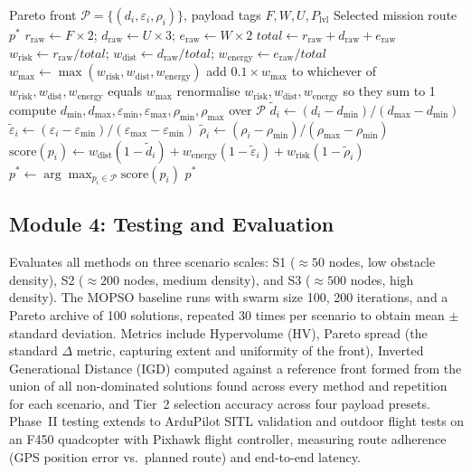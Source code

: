\documentclass{ssnreview}
\begin{document}
\begin{algorithm}[H]
\caption{Payload-Driven Pareto Route Selection (Tier~2)}\label{alg:tier2}
\begin{algorithmic}[1]
\Require Pareto front $\mathcal{P} = \{(d_i,\varepsilon_i,\rho_i)\}$, payload tags $F, W, U, P_\mathrm{lvl}$
\Ensure Selected mission route $p^*$
\State $r_\mathrm{raw} \gets F \times 2$; \quad $d_\mathrm{raw} \gets U \times 3$; \quad $e_\mathrm{raw} \gets W \times 2$
\State $\mathit{total} \gets r_\mathrm{raw} + d_\mathrm{raw} + e_\mathrm{raw}$
\State $w_\mathrm{risk} \gets r_\mathrm{raw}/\mathit{total}$; \quad $w_\mathrm{dist} \gets d_\mathrm{raw}/\mathit{total}$; \quad $w_\mathrm{energy} \gets e_\mathrm{raw}/\mathit{total}$
 
    \State $w_\mathrm{max} \gets \max(w_\mathrm{risk}, w_\mathrm{dist}, w_\mathrm{energy})$
    \State add $0.1 \times w_\mathrm{max}$ to whichever of $w_\mathrm{risk}, w_\mathrm{dist}, w_\mathrm{energy}$ equals $w_\mathrm{max}$
    \State renormalise $w_\mathrm{risk}, w_\mathrm{dist}, w_\mathrm{energy}$ so they sum to 1
\EndIf
\State compute $d_{\min}, d_{\max}, \varepsilon_{\min}, \varepsilon_{\max}, \rho_{\min}, \rho_{\max}$ over $\mathcal{P}$
    \State $\tilde{d}_i \gets (d_i - d_{\min})/(d_{\max} - d_{\min})$ 
    \State $\tilde{\varepsilon}_i \gets (\varepsilon_i - \varepsilon_{\min})/(\varepsilon_{\max} - \varepsilon_{\min})$
    \State $\tilde{\rho}_i \gets (\rho_i - \rho_{\min})/(\rho_{\max} - \rho_{\min})$
    \State $\mathrm{score}(p_i) \gets w_\mathrm{dist}(1-\tilde{d}_i) + w_\mathrm{energy}(1-\tilde{\varepsilon}_i) + w_\mathrm{risk}(1-\tilde{\rho}_i)$
\EndFor
\State $p^* \gets \arg\max_{p_i \in \mathcal{P}} \mathrm{score}(p_i)$
\State \Return $p^*$
\end{algorithmic}
\end{algorithm}

\subsection{Module 4: Testing and Evaluation}
Evaluates all methods on three scenario scales: S1 (${\approx}50$ nodes, low obstacle
density), S2 (${\approx}200$ nodes, medium density), and S3 (${\approx}500$ nodes, high
density). The MOPSO baseline \cite{r6} runs with swarm size 100, 200 iterations, and a Pareto
archive of 100 solutions, repeated 30 times per scenario to obtain mean $\pm$ standard
deviation. Metrics include Hypervolume (HV), Pareto spread (the standard $\Delta$ metric,
capturing extent and uniformity of the front), Inverted Generational Distance (IGD)
computed against a reference front formed from the union of all non-dominated
solutions found across every method and repetition for each scenario, and
Tier~2 selection accuracy across four payload presets. Phase~II testing extends to
ArduPilot SITL validation and outdoor flight tests on an F450 quadcopter with Pixhawk
flight controller, measuring route adherence (GPS position error vs.\ planned route) and
end-to-end latency.
\end{document}

